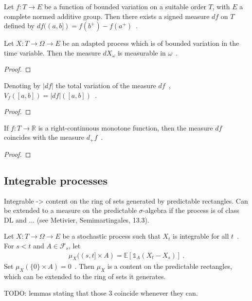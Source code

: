 \begin{definition}\label{def:BoundedVariationOn.vectorMeasure}
  \mathlibok
Let $f : T \to E$ be a function of bounded variation on a suitable order $T$, with $E$ a complete normed additive group.
Then there exists a signed measure $df$ on $T$ defined by $df((a, b]) = f(b^+) - f(a^+)$~.
\end{definition}


\begin{lemma}\label{lem:BoundedVariationOn.measurable_vectorMeasure}
Let $X : T \to \Omega \to E$ be an adapted process which is of bounded variation in the time variable.
Then the measure $dX_\omega$ is measurable in $\omega$~.
\end{lemma}

\begin{proof}

\end{proof}


\begin{lemma}\label{lem:eVariationOn_eq_totalVariation}
Denoting by $\vert df \vert$ the total variation of the measure $df$~,
$V_f([a, b]) = \vert df \vert([a, b])$~.
\end{lemma}

\begin{proof}

\end{proof}


\begin{lemma}\label{lem:BoundedVariationOn.vectorMeasure_of_monotone}
If $f : T \to \mathbb{R}$ is a right-continuous monotone function, then the measure $df$ coincides with the measure $d_+ f$~.
\end{lemma}

\begin{proof}

\end{proof}




\subsection{Integrable processes}

Integrable -> content on the ring of sets generated by predictable rectangles.
Can be extended to a measure on the predictable $\sigma$-algebra if the process is of class DL and ... (see Metivier, Semimartingales, 13.3).

Let $X : T \to \Omega \to E$ be a stochastic process such that $X_t$ is integrable for all $t$~.
For $s < t$ and $A \in \mathcal{F}_s$, let
\begin{align*}
  \mu_X((s, t] \times A) = \mathbb{E}[\mathbb{1}_A (X_t - X_s)]
  \: .
\end{align*}
Set $\mu_X(\{0\} \times A) = 0$~.
Then $\mu_X$ is a content on the predictable rectangles, which can be extended to the ring of sets it generates.

TODO: lemmas stating that those 3 coincide whenever they can.
